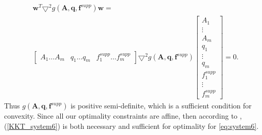 \begin{align*}
&\bm{w}^T\bm{\bigtriangledown}^2 g(\bm{A},\bm{q},\bm{f}^{supp})\bm{w} = \\
&\begin{bmatrix}
A_1 \hdots A_m & q_1 \hdots q_m & f_{1}^{supp} \hdots f_{m}^{supp}
\end{bmatrix}
\bm{\bigtriangledown}^2 g(\bm{A},\bm{q},\bm{f}^{supp})
\begin{bmatrix}
A_1 \\
\vdots\\
A_m\\
q_1\\
\vdots\\
q_m\\
f_{1}^{supp} \\
\vdots \\
f_{m}^ {supp}
\end{bmatrix} = 0.
\end{align*}
Thus $g(\bm{A},\bm{q},\bm{f}^{supp})$ is positive semi-definite, which is a sufficient condition for convexity. Since all our optimality constraints are affine, then according to \cite{KKT_suff}, (\ref{KKT_system6}) is both necessary and sufficient for optimality for \eqref{eq:system6}.

